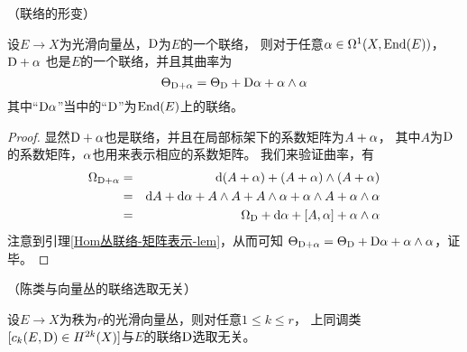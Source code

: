 \begin{lemma}（联络的形变）
\label{联络的形变-lemma}

设$E\to X$为光滑向量丛，$\mathrm{D}$为$E$的一个联络，
则对于任意$\alpha\in\Omega^1(X,\operatorname{End}(E))$，$\mathrm{D}+\alpha$
也是$E$的一个联络，并且其曲率为
$$
  \Theta_{\mathrm{D}+\alpha}
=
  \Theta_{\mathrm{D}}+\mathrm{D}\alpha+\alpha\wedge\alpha
$$
其中“$\mathrm{D}\alpha$”当中的“$\mathrm{D}$”为$\operatorname{End}(E)$上的联络。
\end{lemma}

\begin{proof}显然$\mathrm{D}+\alpha$也是联络，并且在局部标架下的系数矩阵为$A+\alpha$，
其中$A$为$\mathrm{D}$的系数矩阵，$\alpha$也用来表示相应的系数矩阵。
我们来验证曲率，有
\begin{eqnarray*}
     \Omega_{\mathrm{D}+\alpha}
&=&
     \mathrm{d}(A+\alpha)+(A+\alpha)\wedge(A+\alpha)\\
&=&
     \mathrm{d} A+\mathrm{d}\alpha+A\wedge A+A\wedge\alpha+\alpha\wedge A+\alpha\wedge\alpha\\
&=&
     \Omega_{\mathrm{D}}+\mathrm{d}\alpha+[A,\alpha]+\alpha\wedge\alpha
\end{eqnarray*}
注意到引理\ref{Hom丛联络-矩阵表示-lem}，从而可知
$
  \Theta_{\mathrm{D}+\alpha}
=
  \Theta_{\mathrm{D}}+\mathrm{D}\alpha+\alpha\wedge\alpha
$，证毕。
\end{proof}

\begin{thm}（陈类与向量丛的联络选取无关）

设$E\to X$为秩为$r$的光滑向量丛，则对任意$1\leq k\leq r$，
上同调类$[c_k(E,\mathrm{D})\in H^{2k}(X)]$与$E$的联络$\mathrm{D}$选取无关。
\end{thm}

